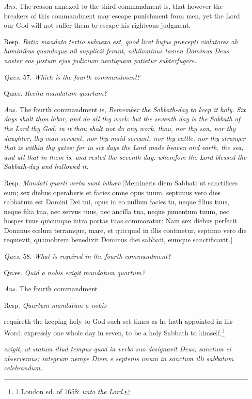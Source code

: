 \emph{Ans.} The reason annexed to the third commandment is, that however the breakers of this commandment may escape punishment from men, yet the Lord our God will not suffer them to escape his righteous judgment.

Resp. \emph{Ratio mandato tertio subnexa est, quod licet hujus præcepti violatores ab hominibus quandoque nil supplicii ferant, nihilominus tamen Dominus Deus noster eos justum ejus judicium neutiquam patietur subterfugere.}

\emph{Ques.} 57. \emph{Which is the fourth commandment?}

Quæs. \emph{Recita mandatum quartum?}

\emph{Ans.} The fourth commandment is, \emph{Remember the Sabbath-day to keep it holy. Six days shalt thou labor, and do all thy work: but the seventh day is the Sabbath of the Lord thy God: in it thou shalt not do any work, thou, nor thy son, nor thy daughter, thy man-servant, nor thy maid-servant, nor thy cattle, nor thy stranger that is within thy gates; for in six days the Lord made heaven and earth, the sea, and all that in them is, and rested the seventh day: wherefore the Lord blessed the Sabbath-day and hallowed it.}

Resp. \emph{Mandati quarti verba sunt isthæc} [Memineris diem Sabbati ut sanctifices eum; sex diebus operaberis et facies omne opus tuum, septimus vero dies sabbatum est Domini Dei tui, opus in eo nullum facies tu, neque filius tuus, neque filia tua, nec servus tuus, nec ancilla tua, neque jumentum tuum, nec hospes tuus quicunque intra portas tuas commoratur: Nam sex diebus perfecit Dominus cœlum terramque, mare, et quicquid in illis continetur, septimo vero die requievit, quamobrem benedixit Dominus diei sabbati, eumque sanctificavit.]

\emph{Ques.} 58. \emph{What is required in the fourth commandment?}

Quæs. \emph{Quid a nobis exigit mandatum quartum?}

\emph{Ans.} The fourth commandment

Resp. \emph{Quartum mandatum a nobis}

requireth the keeping holy to God such set times as he hath appointed in his Word; expressly one whole day in seven, to be a holy Sabbath to himself.\footnote{1 London ed. of 1658: \emph{unto the Lord.}}

\emph{exigit, ut statum illud tempus quod in verbo suo designavit Deus, sanctum ei observemus; integrum nempe Diem e septenis unum in sanctum illi sabbatum celebrandum.}

